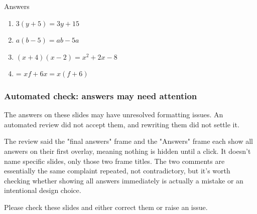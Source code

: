\documentclass{beamer}
\newcommand{\ealtext}[1]{\foreignlanguage{urdu}{#1}}
\newlength{\ealglosswd}
\newlength{\ealglossraise}
\newcommand{\ealkey}[1]{\textcolor{ealkeycolour}{#1}}
\newcommand{\ealgloss}[2]{%
  \sbox{\ealboxen}{\ealkey{#1}}%
  \sbox{\ealboxtr}{\small\textcolor{ealtwocolour}{\ealtext{#2}}}%
  \setlength{\ealglosswd}{\wd\ealboxen}%
  \ifdim\wd\ealboxtr>\ealglosswd\setlength{\ealglosswd}{\wd\ealboxtr}\fi
  \leavevmode
  \makebox[\ealglosswd][c]{%
    \makebox[0pt][c]{\usebox{\ealboxen}}%
    \makebox[0pt][c]{\raisebox{\ealglossraise}{\usebox{\ealboxtr}}}%
  }%
}
\newenvironment{ealglossed}{\par\linespread{2.1}\selectfont\ignorespaces}{\par}
\begin{document}
\begin{frame}{Answers}
\begin{ealglossed}
\begin{enumerate}
  \item \(3(y+5)=3y+15\)
  \item \(a(b-5)=ab-5a\)
  \item \((x+4)(x-2)=x^2+2x-8\)
  \item \ealgloss{Area}{رقبہ} = \(xf + 6x = x(f+6)\)
\end{enumerate}
\end{ealglossed}
\end{frame}

\begin{frame}
\frametitle{Automated check: answers may need attention}
The answers on these slides may have unresolved formatting issues. An automated
review did not accept them, and rewriting them did not settle it.

The review said the "final answers" frame and the "Answers" frame each show all answers on their first overlay, meaning nothing is hidden until a click. It doesn't name specific slides, only those two frame titles. The two comments are essentially the same complaint repeated, not contradictory, but it's worth checking whether showing all answers immediately is actually a mistake or an intentional design choice.

Please check these slides and either correct them or raise an issue.
\end{frame}
\end{document}
